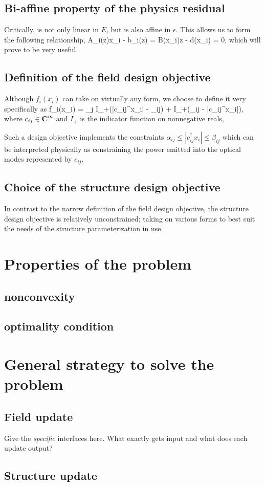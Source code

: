 \documentclass{book}
\newcommand{\T}{^\dagger}
\newcommand{\comps}{{\mbox{\bf C}}}
\begin{document}
\subsection{Bi-affine property of the physics residual}
Critically,  is not only linear in $E$,
    but is also affine in $\epsilon$.
This allows us to form the following relationship,
        {A_i(z)x_i - b_i(z) = B(x_i)z - d(x_i) = 0,}
    which will prove to be very useful.
    

\subsection{Definition of the field design objective}
Although $f_i(x_i)$ can take on virtually any form,
    we choose to define it very specifically as
        {f_i(x_i) = \sum_j I_+(|c_{ij}\T x_i| - \alpha_{ij})
            + I_+(\beta_{ij} - |c_{ij}\T x_i|),}
    where $c_{ij} \in \comps^m$ and 
    $I_+$ is the indicator function on nonnegative reals,

Such a design objective implements the constraints 
    $\alpha_{ij} \le |c_{ij}\T x_i| \le \beta_{ij}$
    which can be interpreted physically as 
    constraining the power emitted into the optical modes
    represented by $c_{ij}$.

\subsection{Choice of the structure design objective}
In contrast to the narrow definition of the field design objective,
    the structure design objective is relatively unconstrained;
    taking on various forms to best suit the needs of
    the structure parameterization in use.

\section{Properties of the problem}
\subsection{nonconvexity}
\subsection{optimality condition}

\section{General strategy to solve the problem}
\subsection{Field update}
Give the \emph{specific} interfaces here. 
What exactly gets input and what does each update output?
\subsection{Structure update}
\end{document}
